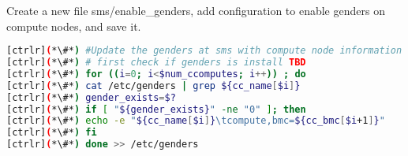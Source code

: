	Create a new file sms/enable\_genders, add configuration to enable genders on compute nodes, and save it. 

 
 
 \begin{lstlisting}[language=bash,keywords={}]
[ctrlr](*\#*) #Update the genders at sms with compute node information
[ctrlr](*\#*) # first check if genders is install TBD
[ctrlr](*\#*) for ((i=0; i<$num_ccomputes; i++)) ; do
[ctrlr](*\#*) cat /etc/genders | grep ${cc_name[$i]}
[ctrlr](*\#*) gender_exists=$?
[ctrlr](*\#*) if [ "${gender_exists}" -ne "0" ]; then 
[ctrlr](*\#*) echo -e "${cc_name[$i]}\tcompute,bmc=${cc_bmc[$i+1]}"
[ctrlr](*\#*) fi
[ctrlr](*\#*) done >> /etc/genders
 \end{lstlisting}
 
